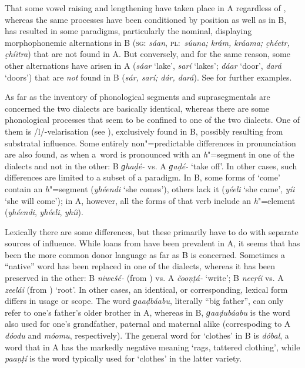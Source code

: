 That some vowel raising and lengthening have taken place in A regardless of , whereas the same processes have been conditioned by  position as well as  in B, has resulted in some paradigms, particularly the nominal, displaying morphophonemic alternations in B (\textsc{sg:} \textit{sáan}, \textsc{pl:}~\textit{súuna; krám, kráama; c̣héetr, c̣híitra}) that are not found in A. But conversely, and for the same reason, some other alternations have arisen in A (\textit{sáar} `lake', \textit{sarí} `lakes'; \textit{dáar} `door', \textit{dará} `doors') that are \textit{not} found in B (\textit{sár, sarí; dár, dará}). See  for further examples.

As far as the inventory of phonological segments and suprasegmentals are concerned the two dialects
are basically identical, whereas there are some phonological processes that seem to be confined to
one of the two dialects. One of them is /l/-velarisation (see ), exclusively
found in B, possibly resulting from \iliKalasha substratal influence. Some entirely non"=predictable differences in pronunciation are also found, as when a~word is pronounced with an \textit{h}"=segment in one of the dialects and not in the other: B \textit{ɡhaḍé-} vs. A \textit{ɡaḍé-} `take off'. In other cases, such differences are limited to a subset of a paradigm. In B, some  forms of `come' contain an \textit{h}"=segment (\textit{yhéendi} `she comes'), others lack it (\textit{yéeli} `she came', \textit{yíi} `she will come'); in A, however, all the forms of that verb include an \textit{h}"=element (\textit{yhéendi}, \textit{yhéeli}, \textit{yhíi}).

\largerpage
Lexically there are some differences, but these primarily have to do with separate sources of influence. While loans from \iliPashto have been prevalent in A, it seems that \iliKhowar has been the more common donor language as far as B is concerned. Sometimes a ``native'' word has been replaced in one of the dialects, whereas it has been preserved in the other: B \textit{niwešé-} (from \iliKhowar) vs. A \textit{čooṇṭá-} `write'; B \textit{neeṛíi} vs. A \textit{zeelái} (from \iliPashto) `root'. In other cases, an identical, or corresponding, lexical form differs in usage or scope. The word \textit{ɡaaḍbáabu}, literally ``big father'', can only refer to one's father's older brother in A, whereas in B, \textit{ɡaaḍubáabu} is the word also used for one's grandfather, paternal and maternal alike (correspoding to A \textit{dóodu} and \textit{móomu}, respectively). The general word for `clothes' in B is \textit{dóbal}, a word that in A has the markedly negative meaning `rags, tattered clothing', while \textit{paaṇṭí} is the word typically used for `clothes' in the latter variety.


